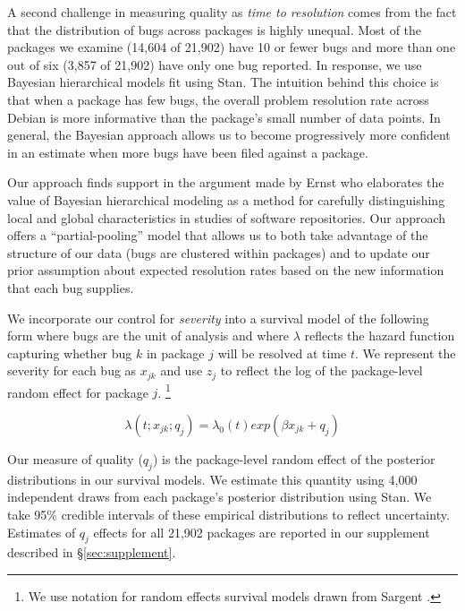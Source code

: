 \documentclass[10pt,conference]{IEEEtran}\usepackage[]{graphicx}\usepackage[usenames,dvipsnames]{color}
\begin{document}
A second challenge in measuring quality as \textit{time to resolution} comes from the fact that the distribution of bugs across packages is highly unequal. Most of the packages we examine (14,604 of 21,902) have 10 or fewer bugs and more than one out of six (3,857 of 21,902) have only one bug reported.
In response, we use Bayesian hierarchical models fit using Stan. The intuition behind this choice is that when a package has few bugs, the overall problem resolution rate across Debian is more informative than the package's small number of data points. In general, the Bayesian approach allows us to become progressively more confident in an estimate when more bugs have been filed against a package. 

Our approach finds support in the argument made by Ernst \cite{ernst_bayesian_2018} who elaborates the value of Bayesian hierarchical modeling as a method for carefully distinguishing local and global characteristics in studies of software repositories.
Our approach offers a ``partial-pooling'' model that allows us to both take advantage of the structure of our data (bugs are clustered within packages) and to update our prior assumption about expected resolution rates based on the new information that each bug supplies.


We incorporate our control for \textit{severity} into a survival model of the following form where bugs are the unit of analysis and where $\lambda$ reflects the hazard function  capturing whether bug $k$ in package $j$ will be resolved at time $t$. We represent
the severity for each bug as $x_{jk}$  and use $z_j$ to reflect the log of the package-level random effect for package $j$.
\footnote{We use notation for random effects survival models drawn from Sargent \cite{sargent_general_1998}.}

\begin{equation*}
\lambda (t; x_{jk}; q_j) = \lambda_0 (t) exp(\beta x_{jk} + q_j)
\end{equation*}

\noindent Our measure of quality ($q_j$) is the package-level random effect of the posterior distributions in our survival models. We estimate this quantity using 4,000 independent draws from each package's posterior distribution using Stan. We take 95\% credible intervals of these empirical distributions to reflect uncertainty.  Estimates of $q_j$ effects for all 21,902 packages are reported in our supplement described in §\ref{sec:supplement}.
\end{document}
